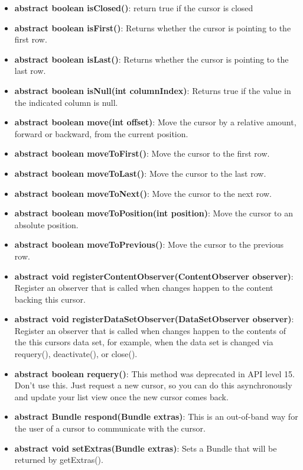 \documentclass{report}
\begin{document}
\begin{itemize}
\begin{itemize}
\begin{itemize}
                \item \textbf{abstract boolean	isClosed()}: return true if the cursor is closed
                \item \textbf{abstract boolean	isFirst()}: Returns whether the cursor is pointing to the first row.
                \item \textbf{abstract boolean	isLast()}: Returns whether the cursor is pointing to the last row.
                \item \textbf{abstract boolean	isNull(int columnIndex)}: Returns true if the value in the indicated column is null.
                \item \textbf{abstract boolean	move(int offset)}: Move the cursor by a relative amount, forward or backward, from the current position.
                \item \textbf{abstract boolean	moveToFirst()}: Move the cursor to the first row.
                \item \textbf{abstract boolean	moveToLast()}: Move the cursor to the last row.
                \item \textbf{abstract boolean	moveToNext()}: Move the cursor to the next row.
                \item \textbf{abstract boolean	moveToPosition(int position)}: Move the cursor to an absolute position.
                \item \textbf{abstract boolean	moveToPrevious()}: Move the cursor to the previous row.
                \item \textbf{abstract void	registerContentObserver(ContentObserver observer)}: Register an observer that is called when changes happen to the content backing this cursor.
                \item \textbf{abstract void	registerDataSetObserver(DataSetObserver observer)}: Register an observer that is called when changes happen to the contents of the this cursors data set, for example, when the data set is changed via requery(), deactivate(), or close().
                \item \textbf{abstract boolean	requery()}: This method was deprecated in API level 15. Don't use this. Just request a new cursor, so you can do this asynchronously and update your list view once the new cursor comes back.
                \item \textbf{abstract Bundle	respond(Bundle extras)}: This is an out-of-band way for the user of a cursor to communicate with the cursor.
                \item \textbf{abstract void	setExtras(Bundle extras)}: Sets a Bundle that will be returned by getExtras().

\end{itemize}
\end{itemize}
\end{itemize}
\end{document}
